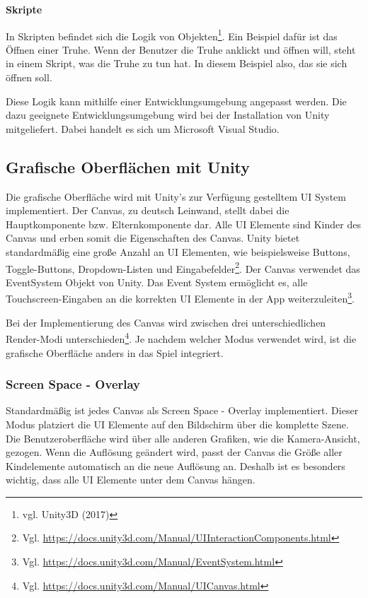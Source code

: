 \textbf{Skripte}

In Skripten befindet sich die Logik von Objekten\footnote{vgl. Unity3D \cite{unity8} (2017)}. Ein Beispiel dafür ist das Öffnen einer Truhe. Wenn der Benutzer die Truhe anklickt und öffnen will, steht in einem Skript, was die Truhe zu tun hat. In diesem Beispiel also, das sie sich öffnen soll. 

Diese Logik kann mithilfe einer Entwicklungsumgebung angepasst werden. Die dazu geeignete Entwicklungsumgebung wird bei der Installation von Unity mitgeliefert. Dabei handelt es sich um Microsoft Visual Studio.

	\subsection{Grafische Oberflächen mit Unity}
Die grafische Oberfläche wird mit Unity's zur Verfügung gestelltem UI System implementiert. Der Canvas, zu deutsch Leinwand, stellt dabei die Hauptkomponente bzw. Elternkomponente dar. Alle UI Elemente sind Kinder des Canvas und erben somit die Eigenschaften des Canvas. Unity bietet standardmäßig eine große Anzahl an UI Elementen, wie beispielsweise Buttons, Toggle-Buttons, Dropdown-Listen und Eingabefelder\footnote{Vgl. \url{https://docs.unity3d.com/Manual/UIInteractionComponents.html}}. Der Canvas verwendet das EventSystem Objekt von Unity. Das Event System ermöglicht es, alle Touchscreen-Eingaben an die korrekten UI Elemente in der App weiterzuleiten\footnote{Vgl. \url{https://docs.unity3d.com/Manual/EventSystem.html}}.

Bei der Implementierung des Canvas wird zwischen drei unterschiedlichen Render-Modi unterschieden\footnote{Vgl. \url{https://docs.unity3d.com/Manual/UICanvas.html}}. Je nachdem welcher Modus verwendet wird, ist die grafische Oberfläche anders in das Spiel integriert.

\subsubsection{Screen Space - Overlay}
Standardmäßig ist jedes Canvas als Screen Space - Overlay implementiert. Dieser Modus platziert die UI Elemente auf den Bildschirm über die komplette Szene. Die Benutzeroberfläche wird über alle anderen Grafiken, wie die Kamera-Ansicht, gezogen. Wenn die Auflösung geändert wird, passt der Canvas die Größe aller Kindelemente automatisch an die neue Auflösung an. Deshalb ist es besonders wichtig, dass alle UI Elemente unter dem Canvas hängen. 

